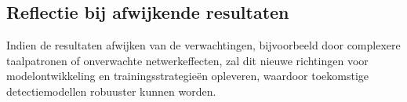 \subsection{Reflectie bij afwijkende resultaten}
Indien de resultaten afwijken van de verwachtingen, bijvoorbeeld door complexere taalpatronen of onverwachte netwerkeffecten, zal dit nieuwe richtingen voor modelontwikkeling en trainingsstrategieën opleveren, waardoor toekomstige detectiemodellen robuuster kunnen worden.
